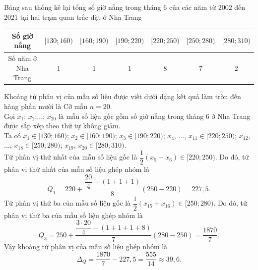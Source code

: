 \begin{ex}[Mức độ 2]%
	Bảng sau thống kê lại tổng số giờ nắng trong tháng $6$ của các năm từ $2002$ đến $2021$ tại hai trạm quan trắc đặt ở Nha Trang
	\begin{center}
		\begin{tabular}{|c|c|c|c|c|c|c|}
			\hline
			Số giờ nắng &$[130;160)$  & $[160;190)$ & $[190;220)$ & $[220;250)$ & $[250;280)$ & $[280;310)$\\
			\hline
			Số năm ở Nha Trang	& $1$ & $1$ & $1$ & $8$ & $7$ & $2$\\
			\hline
		\end{tabular}
	\end{center}
	Khoảng tứ phân vị của mẫu số liệu được viết dưới dạng kết quả làm tròn đến hàng phần mười là
	\loigiai 
	{	
		Cỡ mẫu $n=20$.\\
		Gọi $x_1$; $x_2$;$\ldots$; $x_{20}$ là mẫu số liệu gốc gồm số giờ nắng trong tháng $6$ ở Nha Trang được sắp xếp theo thứ tự không giảm.\\
		Ta có $x_1\in [130;160)$; $x_2\in [160;190)$; $x_3\in [190;220)$; $x_4$, $\dots$, $x_{11}\in [220;250)$; $x_{12}$, $\dots$, $x_{18}\in [250;280)$; $x_{19}$, $x_{20}\in [280;310)$.\\
		Tứ phân vị thứ nhất của mẫu số liệu gốc là $\dfrac{1}{2}(x_5+x_6)\in [220;250)$. Do đó, tứ phân vị thứ nhất của mẫu số liệu ghép nhóm là 
		$$Q_1=220+\dfrac{\dfrac{20}{4}-(1+1+1)}{8}(250-220)=227{,}5.$$
		Tứ phân vị thứ ba của mẫu số liệu gốc là $\dfrac{1}{2}(x_{15}+x_{16})\in [250;280)$. Do đó, tứ phân vị thứ ba của mẫu số liệu ghép nhóm là 
		$$Q_3=250+\dfrac{\dfrac{3\cdot 20}{4}-(1+1+1+8)}{7}(280-250)=\dfrac{1870}{7}.$$
		Vậy khoảng tứ phân vị của mẫu số liệu ghép nhóm là 
		$$\Delta_Q=\dfrac{1870}{7}-227{,}5=\dfrac{555}{14}\approx 39{,}6.$$
	}
\end{ex}

